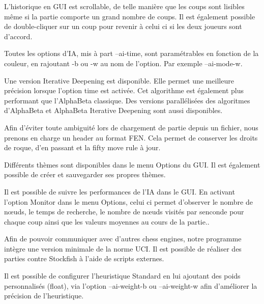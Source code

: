 \documentclass{article}
\begin{document}
\begin{needbox}
    L'historique en GUI est scrollable, de telle manière que les coups sont lisibles même si la partie
    comporte un grand nombre de coups. Il est également possible de double-cliquer sur un coup pour revenir à celui ci si les deux joueurs sont d'accord.
\end{needbox}

\begin{needbox}[F62: IA paramétrable]
   Toutes les options d'IA, mis à part --ai-time, sont paramétrables en fonction de la couleur, en rajoutant 
   -b ou -w au nom de l'option. Par exemple --ai-mode-w.
\end{needbox}

\begin{needbox}
   Une version Iterative Deepening est disponible. Elle permet une meilleure précision lorsque l'option time est activée. Cet algorithme est également plus performant que l'AlphaBeta classique.
   Des versions parallélisées des algoritmes d'AlphaBeta et AlphaBeta Iterative Deepening sont aussi disponibles.
\end{needbox}

\begin{needbox}
   Afin d'éviter toute ambiguité lors de chargement de partie depuis un fichier, nous prenons en charge un header au format FEN. Cela permet de conserver les droits de roque, d'en passant et la fifty move rule à jour.
\end{needbox}

\begin{needbox}
    Différents thèmes sont disponibles dans le menu Options du GUI. Il est également possible de créer et sauvegarder ses propres thèmes.
\end{needbox}

\begin{needbox}[F66: Monitoring de l'IA]
    Il est possible de suivre les performances de l'IA dans le GUI. En activant l'option Monitor dans le menu Options, celui ci permet d'observer le nombre de nœuds, le temps de recherche, le nombre de nœuds visités par senconde pour chaque coup ainsi que les valeurs moyennes au cours de la partie..
\end{needbox}

\begin{needbox}
    Afin de pouvoir communiquer avec d'autres chess engines, notre programme intègre une version minimale de la norme UCI. Il est possible de réaliser des parties contre Stockfish à l'aide de scripts externes.
\end{needbox}

\begin{needbox}
    Il est possible de configurer l'heuristique Standard en lui ajoutant des poids personnalisés (float), via l'option --ai-weight-b ou --ai-weight-w afin d'améliorer la précision de l'heuristique.
\end{needbox}
\end{document}
